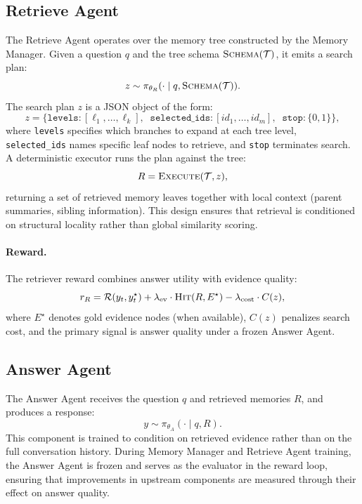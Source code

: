 \subsection{Retrieve Agent}
The Retrieve Agent operates over the memory tree constructed by the Memory Manager. Given a question $q$ and the tree schema $\textsc{Schema}(\mathcal{T})$, it emits a search plan:
\begin{equation}
z \sim \pi_{\theta_R}(\cdot \mid q, \textsc{Schema}(\mathcal{T})).
\end{equation}
The search plan $z$ is a JSON object of the form:
\begin{equation}
z = \{\texttt{levels}: [\ell_1, \ldots, \ell_k], \;\; \texttt{selected\_ids}: [id_1, \ldots, id_m], \;\; \texttt{stop}: \{0,1\}\},
\end{equation}
where \texttt{levels} specifies which branches to expand at each tree level, \texttt{selected\_ids} names specific leaf nodes to retrieve, and \texttt{stop} terminates search. A deterministic executor runs the plan against the tree:
\begin{equation}
R = \textsc{Execute}(\mathcal{T}, z),
\end{equation}
returning a set of retrieved memory leaves together with local context (parent summaries, sibling information). This design ensures that retrieval is conditioned on structural locality rather than global similarity scoring.

\paragraph{Reward.}
The retriever reward combines answer utility with evidence quality:
\begin{equation}
r_R = \mathcal{R}(y_t, y_t^\star) + \lambda_{\text{ev}} \cdot \textsc{Hit}(R, E^\star) - \lambda_{\text{cost}} \cdot C(z),
\end{equation}
where $E^\star$ denotes gold evidence nodes (when available), $C(z)$ penalizes search cost, and the primary signal is answer quality under a frozen Answer Agent.

\subsection{Answer Agent}
The Answer Agent receives the question $q$ and retrieved memories $R$, and produces a response:
\begin{equation}
y \sim \pi_{\theta_A}(\cdot \mid q, R).
\end{equation}
This component is trained to condition on retrieved evidence rather than on the full conversation history. During Memory Manager and Retrieve Agent training, the Answer Agent is frozen and serves as the evaluator in the reward loop, ensuring that improvements in upstream components are measured through their effect on answer quality.

